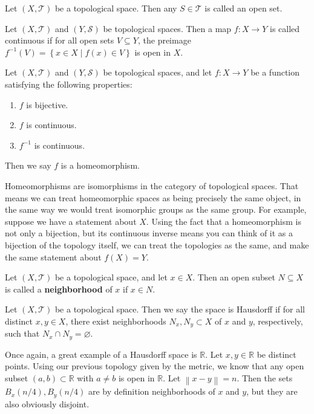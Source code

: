 \documentclass[11pt, letterpaper]{report}
\begin{document}
\begin{definition}\label{dfn:2}
	Let $(X,\mathcal{T} )$ be a topological space. Then any $S\in \mathcal{T} $ is called an open set.
\end{definition}
\begin{definition}\label{dfn:3}
	Let $(X,\mathcal{T} )$ and $(Y,\mathcal{S} )$ be topological spaces. Then a map $f : X \to Y$ is called continuous if for all open sets $V\subseteq Y$, the preimage $f^{-1}(V)=\left\{ x\in X \mid f(x)\in V \right\} $ is open in $X$.
\end{definition}
\begin{definition}[Homeomorphism]\label{dfn:4}
	Let $(X,\mathcal{T} )$ and $(Y,\mathcal{S} )$ be topological spaces, and let $f : X \to Y$ be a function satisfying the following properties:
	\begin{enumerate}
		\item $f$ is bijective.
		\item $f$ is continuous.
		\item $f^{-1}$ is continuous.
	\end{enumerate}
	Then we say $f$ is a homeomorphism.
\end{definition}
Homeomorphisms are isomorphisms in the category of topological spaces. That means we can treat homeomorphic spaces as being precisely the same object, in the same way we would treat isomorphic groups as the same group. For example, suppose we have a statement about $X$. Using the fact that a homeomorphism is not only a bijection, but its continuous inverse means you can think of it as a bijection of the topology itself, we can treat the topologies as the same, and make the same statement about $f(X)=Y$.
\begin{definition}[Neighborhood]\label{dfn:5}
	Let $(X,\mathcal{T} )$ be a topological space, and let $x\in X$. Then an open subset $N\subseteq X$ is called a \textbf{neighborhood} of $x$ if $x\in N$.
\end{definition}
\begin{definition}[Hausdorff]\label{dfn:6}
	Let $(X,\mathcal{T} )$ be a topological space. Then we say the space is Hausdorff if for all distinct $x,y\in X$, there exist neighborhoods $N_x,N_y\subset X$ of $x$ and $y$, respectively, such that $N_x\cap N_y=\varnothing$.
\end{definition}
Once again, a great example of a Hausdorff space is $\mathbb{R}$. Let $x,y\in\mathbb{R}$ be distinct points. Using our previous topology given by the metric, we know that any open subset $(a,b)\subset \mathbb{R}$ with $a\neq b$ is open in $\mathbb{R}$. Let $\left\lVert x-y \right\rVert =n$. Then the sets $B_x(n / 4),B_y(n  /4)$ are by definition neighborhoods of $x$ and $y$, but they are also obviously disjoint.
\end{document}
